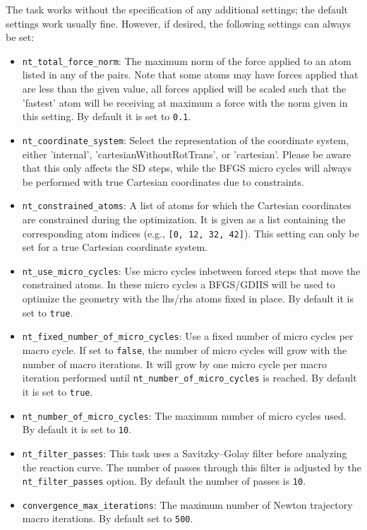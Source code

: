\documentclass[]{tufte-book}
\begin{document}
The task works without the specification of any additional settings; the default settings work usually fine. However,
if desired, the following settings can always be set:
\begin{itemize}
\item \texttt{nt\_total\_force\_norm}: The maximum norm of the force applied to an atom listed in any of the pairs.
 Note that some atoms may have forces applied that are less than the given value, all forces applied will be scaled
 such that the 'fastest' atom will be receiving at maximum a force with the norm given in this setting.
 By default it is set to \texttt{0.1}.
\item \texttt{nt\_coordinate\_system}: Select the representation of the coordinate system, either
 'internal'\cite{libirc}, 'cartesianWithoutRotTrans', or 'cartesian'.
Please be aware that this only affects the SD steps, while the BFGS micro cycles will always be performed with true
 Cartesian coordinates due to constraints.
\item \texttt{nt\_constrained\_atoms}: A list of atoms for which the Cartesian coordinates are constrained during the optimization.
  It is given as a list containing the corresponding atom indices (e.g., \texttt{[0, 12, 32, 42]}). This setting can only be set for a true Cartesian coordinate system.
\item \texttt{nt\_use\_micro\_cycles}: Use micro cycles inbetween forced steps that move the constrained atoms.
In these micro cycles a BFGS/GDIIS will be used to optimize the geometry with the lhs/rhs atoms fixed in place.
By default it is set to \texttt{true}.
\item \texttt{nt\_fixed\_number\_of\_micro\_cycles}: Use a fixed number of micro cycles per macro cycle. If set to
\texttt{false}, the number of micro cycles will grow with the number of macro iterations. It will grow by one micro
cycle per macro iteration performed until \texttt{nt\_number\_of\_micro\_cycles} is reached. By default it is set to \texttt{true}.
\item \texttt{nt\_number\_of\_micro\_cycles}: The maximum number of micro cycles used. By default it is set to \texttt{10}.
\item \texttt{nt\_filter\_passes}: This task uses a Savitzky--Golay filter before analyzing the reaction curve. The number of passes
through this filter is adjusted by the \texttt{nt\_filter\_passes} option. By default the number of passes is \texttt{10}.
\item \texttt{convergence\_max\_iterations}: The maximum number of Newton trajectory macro iterations. By default set to \texttt{500}.

\end{itemize}
\end{document}
